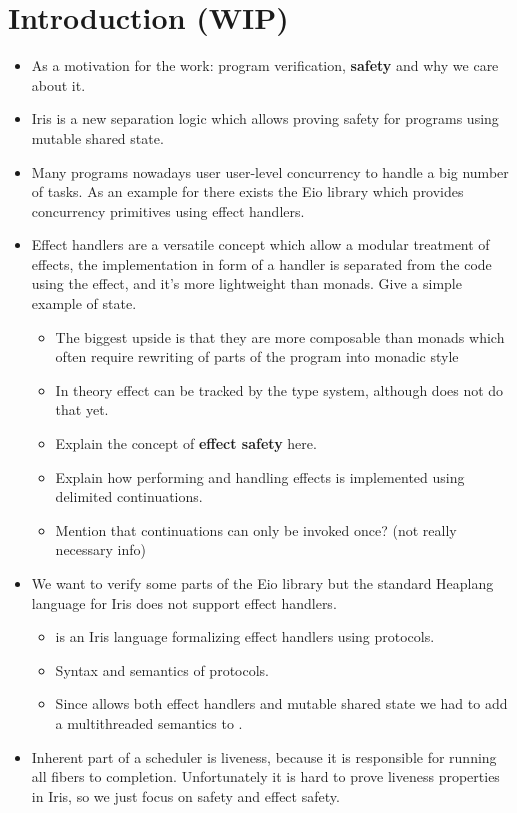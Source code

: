 \section{Introduction (WIP)}
\label{sec:introduction}

\begin{itemize}
  \item As a motivation for the work: program verification, \textbf{safety} and why we care about it.
  \item Iris is a new separation logic which allows proving safety for programs using mutable shared state.
  \item Many programs nowadays user user-level concurrency to handle a big number of tasks. As an example for \ocf{} there exists the Eio library which provides concurrency primitives using effect handlers.
  \item Effect handlers are a versatile concept which allow a modular treatment of effects, the implementation in form of a handler is separated from the code using the effect, and it's more lightweight than monads. Give a simple example of state.
        \begin{itemize}
          \item The biggest upside is that they are more composable than monads which often require rewriting of parts of the program into monadic style
          \item In theory effect can be tracked by the type system, although \ocf{} does not do that yet.
          \item Explain the concept of \textbf{effect safety} here.
          \item Explain how performing and handling effects is implemented using delimited continuations.
          \item Mention that continuations can only be invoked once? (not really necessary info)
        \end{itemize}
  \item We want to verify some parts of the Eio library but the standard Heaplang language for Iris does not support effect handlers.
        \begin{itemize}
          \item \hazel{} is an Iris language formalizing effect handlers using protocols.
          \item Syntax and semantics of protocols.
          \item Since \ocf{} allows both effect handlers and mutable shared state we had to add a multithreaded semantics to \hazel{}.
        \end{itemize}
  \item Inherent part of a scheduler is liveness, because it is responsible for running all fibers to completion. Unfortunately it is hard to prove liveness properties in Iris, so we just focus on safety and effect safety.
\end{itemize}

